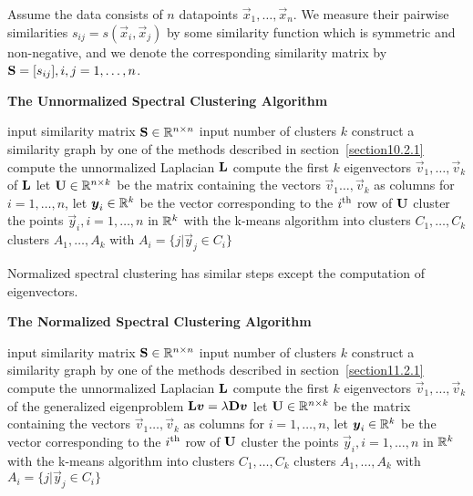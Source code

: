 Assume the data consists of $n$ datapoints $\vec{x}_1,\dotsc,\vec{x}_n$. We measure their pairwise similarities $s_{ij}=s(\vec{x}_i,\vec{x}_j)$ by some similarity function which is symmetric and non-negative, and we denote the corresponding similarity matrix by $\mathbf{S}=[s_{ij}],i,j=1,\dotsc,n$.
\begin{algorithm}[H]
	\caption*{\bf The Unnormalized Spectral Clustering Algorithm}
	\begin{algorithmic}
		\State input similarity matrix $\mathbf{S}\in\mathbb{R}^{n\times n}$
		\State input number of clusters $k$
		\State construct a similarity graph by one of the methods described in section~\ref{section10.2.1}
		\State compute the unnormalized Laplacian $\mathbf{L}$
		\State compute the first $k$ eigenvectors $\vec{v}_1,\dotsc,\vec{v}_k$ of $\mathbf{L}$
		\State let $\mathbf{U}\in\mathbb{R}^{n\times k}$ be the matrix containing the vectors $\vec{v}_1\dotsc,\vec{v}_k$ as columns
		\State for $i=1,\dotsc,n$, let $\boldsymbol{y}_i\in\mathbb{R}^k$ be the vector corresponding to the $i^\text{th}$ row of $\mathbf{U}$
		\State cluster the points $\vec{y}_i,i=1,\dotsc,n$ in $\mathbb{R}^k$ with the k-means algorithm into clusters $C_1,\dotsc,C_k$
		\State \Return clusters $A_1,\dotsc,A_k$ with $A_i=\{j|\vec{y}_j\in C_i\}$
	\end{algorithmic}
\end{algorithm}
Normalized spectral clustering has similar steps except the computation of eigenvectors.
\begin{algorithm}[H]
	\caption*{\bf The Normalized Spectral Clustering Algorithm}
	\begin{algorithmic}
		\State input similarity matrix $\mathbf{S}\in\mathbb{R}^{n\times n}$
		\State input number of clusters $k$
		\State construct a similarity graph by one of the methods described in section~\ref{section11.2.1}
		\State compute the unnormalized Laplacian $\mathbf{L}$
		\State compute the first $k$ eigenvectors $\vec{v}_1,\dotsc,\vec{v}_k$ of the generalized eigenproblem $\mathbf{L}\boldsymbol{v}=\lambda\mathbf{D}\boldsymbol{v}$
		\State let $\mathbf{U}\in\mathbb{R}^{n\times k}$ be the matrix containing the vectors $\vec{v}_1\dotsc,\vec{v}_k$ as columns
		\State for $i=1,\dotsc,n$, let $\boldsymbol{y}_i\in\mathbb{R}^k$ be the vector corresponding to the $i^\text{th}$ row of $\mathbf{U}$
		\State cluster the points $\vec{y}_i,i=1,\dotsc,n$ in $\mathbb{R}^k$ with the k-means algorithm into clusters $C_1,\dotsc,C_k$
		\State \Return clusters $A_1,\dotsc,A_k$ with $A_i=\{j|\vec{y}_j\in C_i\}$
	\end{algorithmic}
\end{algorithm}

